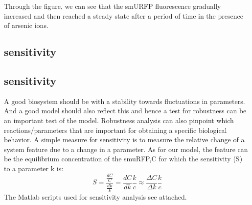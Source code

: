 Through the figure, we can see that the smURFP fluorescence gradually increased and then reached a steady state after a period of time  in the presence of arsenic ions.

\subsection{sensitivity }
\subsection{sensitivity }
A good biosystem should be with a stability towards fluctuations in parameters. And  a  good model should also reflect this and hence a test for robustness can be an important test of the model.
Robustness analysis can also pinpoint which reactions/parameters that are important for obtaining a specific biological behavior. A simple measure for sensitivity is to measure the relative change of a system feature due to a change in a parameter. As for our model, the feature can be the equilibrium concentration of the smuRFP,C for which the sensitivity (S) to a parameter k is:
\begin{equation}
S=\frac{\frac{dC}{C}}{\frac{dk}{k}}=\frac{dC}{dk}\frac{k}{c}\approx \frac{\Delta C}{\Delta k}\frac{k}{c}
\end{equation}
The Matlab scripts used for sensitivity analysis see attached.
